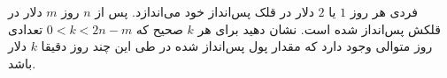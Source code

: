     \p 
فردی هر روز
$1$
یا
$2$
دلار در قلک پس‌انداز خود می‌اندازد. پس از
$n$
روز
$m$
دلار در قلکش پس‌انداز شده است. نشان دهید برای هر
$k$
صحیح که
$0 < k < 2n - m$
تعدادی روز متوالی وجود دارد که مقدار پول پس‌انداز شده در طی این چند روز دقیقا
$k$
دلار باشد.